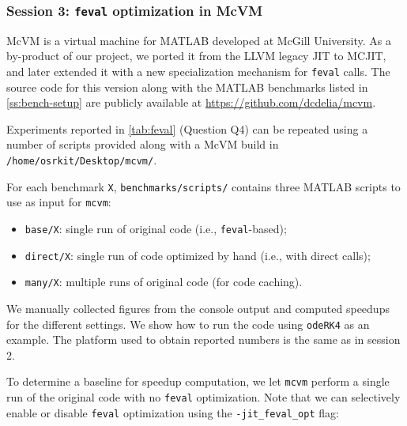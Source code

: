 
\subsubsection{Session 3: {\tt feval} optimization in McVM}

McVM is a virtual machine for MATLAB developed at McGill University. As a by-product of our project, we ported it from the LLVM legacy JIT to MCJIT, and later extended it with a new specialization mechanism for {\tt feval} calls. The source code for this version along with the MATLAB benchmarks listed in \mysection\ref{ss:bench-setup} are publicly available at \url{https://github.com/dcdelia/mcvm}.

Experiments reported in \mytable\ref{tab:feval} (Question Q4) can be repeated using a number of scripts provided along with a McVM build in {\small\tt /home/osrkit/Desktop/mcvm/}. %

\noindent For each benchmark {\tt X}, {\small\tt benchmarks/scripts/} contains three MATLAB scripts to use as input for {\tt mcvm}:

\begin{itemize}[parsep=0pt]
\item {\tt base/X}: single run of original code (i.e., {\tt feval}-based);
\item {\tt direct/X}: single run of code optimized by hand (i.e., with direct calls);
\item {\tt many/X}: multiple runs of original code (for code caching).
\end{itemize}

\noindent We manually collected figures from the console output and computed speedups for the different settings. We show how to run the code using {\tt odeRK4} as an example. The platform used to obtain reported numbers is the same as in session 2.

To determine a baseline for speedup computation, we let {\tt mcvm} perform a single run of the original code with no {\tt feval} optimization. Note that we can selectively enable or disable {\tt feval} optimization using the {\tt -jit\_feval\_opt} flag:


